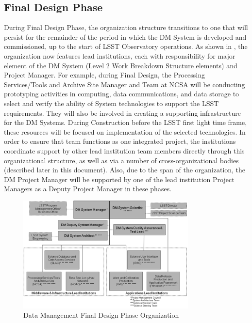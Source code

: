 \subsection{
Final Design Phase
}
During Final Design Phase, the organization structure transitions to one that will persist for the remainder of the period in which the DM System is developed and commissioned, up to the start of LSST Observatory operations.
As shown in , the organization now features lead institutions, each with responsibility for major element of the DM System (Level 2 Work Breakdown Structure elements) and Project Manager.  For example, during Final Design, the Processing Services/Tools and Archive Site Manager and Team at NCSA will be conducting prototyping activities in computing, data communications, and data storage to select and verify the ability of System technologies to support the LSST requirements.  They will also be involved in creating a supporting infrastructure for the DM Systems.  During Construction before the LSST first light time frame, these resources will be focused on implementation of the selected technologies.  In order to ensure that team functions as one integrated project, the institutions coordinate support by other lead institution team members directly through this organizational structure, as well as via a number of cross-organizational bodies (described later in this document). 
Also, due to the span of the organization, the DM Project Manager will be supported by one of the lead institution Project Managers as a Deputy Project Manager in these phases.


\begin{figure}[htbp]
\begin{center}
 \includegraphics[width=0.8\textwidth]{images/fdphase}
\caption{ Data Management Final Design Phase Organization\label{fig:fdphase}}
\end{center}
\end{figure}



